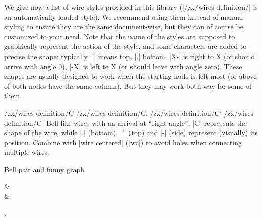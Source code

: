 \documentclass[a4paper]{ltxdoc}
\begin{document}
We give now a list of wire styles provided in this library (|/zx/wires definition/| is an automatically loaded style). We recommend using them instead of manual styling to ensure they are the same document-wise, but they can of course be customized to your need. Note that the name of the styles are supposed to graphically represent the action of the style, and some characters are added to precise the shape: typically |'| means top, |.| bottom, |X-| is right to X (or should arrive with angle 0), |-X| is left to X (or should leave with angle zero). These shapes are usually designed to work when the starting node is left most (or above of both nodes have the same column). But they may work both way for some of them.


\begin{pgfmanualentry}
  \makeatletter
  \def\extrakeytext{style, }
  \extractkey/zx/wires definition/C\@nil%
  \extractkey/zx/wires definition/C.\@nil%
  \extractkey/zx/wires definition/C'\@nil%
  \extractkey/zx/wires definition/C-\@nil%
  \makeatother
  \pgfmanualbody
  Bell-like wires with an arrival at ``right angle'', |C| represents the shape of the wire, while |.| (bottom), |'| (top) and |-| (side) represent (visually) its position. Combine with |wire centered| (|wc|) to avoid holes when connecting multiple wires.
\begin{codeexample}[]
  Bell pair \zx{\zxNone{} \ar[d,C,wc] \\[\zxWRow]
                \zxNone{}}
  and funny graph
  \begin{ZX}
    \zxX{} \ar[d,C] \ar[r,C']  & \zxZ{} \ar[d,C-]\\
    \zxZ{} \ar[r,C.]           & \zxX{}
  \end{ZX}.
\end{codeexample}
\end{pgfmanualentry}
\end{document}

